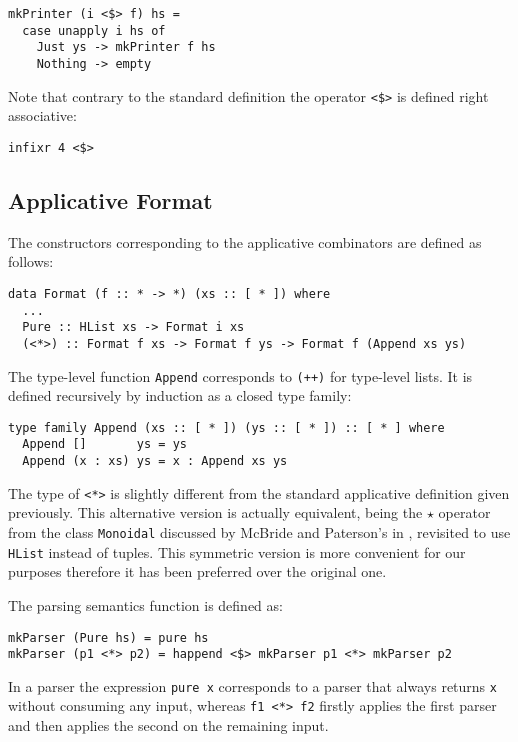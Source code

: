 \documentclass[../Thesis.tex]{subfiles}
\begin{document}
\begin{verbatim}
mkPrinter (i <$> f) hs = 
  case unapply i hs of
    Just ys -> mkPrinter f hs
    Nothing -> empty
\end{verbatim}

Note that contrary to the standard definition the operator \texttt{<\$>} is defined right associative:

\begin{verbatim}
infixr 4 <$>
\end{verbatim}

\subsection{Applicative Format}
\label{subsec:ApplicativeFormat}
The constructors corresponding to the applicative combinators are defined as follows:

\begin{verbatim}
data Format (f :: * -> *) (xs :: [ * ]) where
  ...
  Pure :: HList xs -> Format i xs
  (<*>) :: Format f xs -> Format f ys -> Format f (Append xs ys)
\end{verbatim}

The type-level function \texttt{Append} corresponds to \texttt{(++)} for type-level lists. It is defined recursively by induction as a closed type family:

\begin{verbatim}
type family Append (xs :: [ * ]) (ys :: [ * ]) :: [ * ] where
  Append []       ys = ys
  Append (x : xs) ys = x : Append xs ys
\end{verbatim}

The type of \texttt{<*>} is slightly different from the standard applicative definition given previously.
This alternative version is actually equivalent, being the \texttt{$\star$} operator from the class \texttt{Monoidal} discussed by McBride and Paterson’s in \cite{Mcbride08Ape}, revisited to use \texttt{HList} instead of tuples.
This symmetric version is more convenient for our purposes therefore it has been preferred over the original one.

The parsing semantics function is defined as:
\begin{verbatim}
mkParser (Pure hs) = pure hs
mkParser (p1 <*> p2) = happend <$> mkParser p1 <*> mkParser p2
\end{verbatim} 
In a parser the expression \texttt{pure x} corresponds to a parser that always returns \texttt{x} without consuming any input, whereas \texttt{f1 <*> f2} firstly applies the first parser and then applies the second on the remaining input. 
\end{document}
